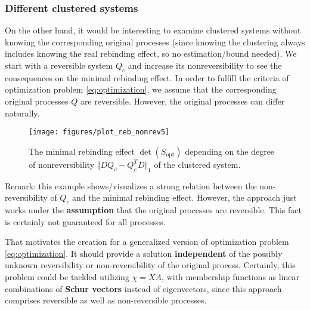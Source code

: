 \subsubsection*{Different clustered systems}




On the other hand, it would be interesting to examine clustered systems without knowing the corresponding original processes (since knowing the clustering always includes knowing the real rebinding effect, so no estimation/bound needed).
We start with a reversible system $Q_c$ and increase its nonreversibility to see the consequences on the minimal rebinding effect.
In order to fulfill the criteria of optimization problem \eqref{eq:optimization}, we assume that the corresponding original processes $Q$ are reversible. 
However, the original processes can differ naturally.
\\

\begin{figure}[!ht]
	\label{fig:rebinding_nonreversible}
	\centering
	
	\texttt{[image: figures/plot\_reb\_nonrev5]}
	
	\caption{The minimal rebinding effect $\det(S_\mathrm{opt})$ depending on the degree of nonreversibility $\Vert DQ_c -Q_c^T D \Vert_1$ of the clustered system.}
	
\end{figure}

Remark: this example shows/visualizes a strong relation between the non-reversibility of $Q_c$ and the minimal rebinding effect. However, the approach just works under the \textbf{assumption} that the original processes are reversible. This fact is certainly not guaranteed for all processes.

That motivates the creation for a generalized version of optimization problem \eqref{eq:optimization}. It should provide a solution \textbf{independent} of the possibly unknown reversibility or non-reversibility of the original process. Certainly, this problem could be tackled utilizing $\chi = XA$, with membership functions as linear combinations of \textbf{Schur vectors} instead of eigenvectors, since this approach comprises reversible as well as non-reversible processes.
\newpage

